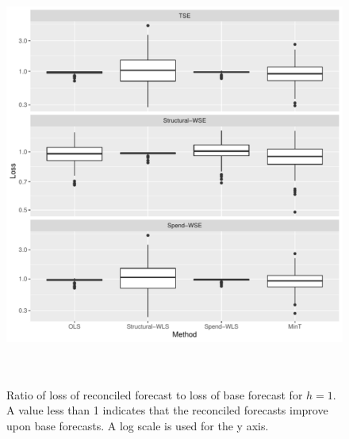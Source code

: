 \documentclass[12pt]{article}
\begin{document}
    	\begin{figure}[!hbt]
  	\centering
  	\small
  	\includegraphics[width = \textwidth, height=14cm]{lossboxplots_3.pdf}
  	\caption{Ratio of loss of reconciled forecast to loss of base forecast for $h = 1$. A value less than 1 indicates that the reconciled forecasts improve upon base forecasts.  A log scale is used for the y axis.}
  	\label{fig:BaseVSRecon_Fch3}
  \end{figure}
\end{document}
